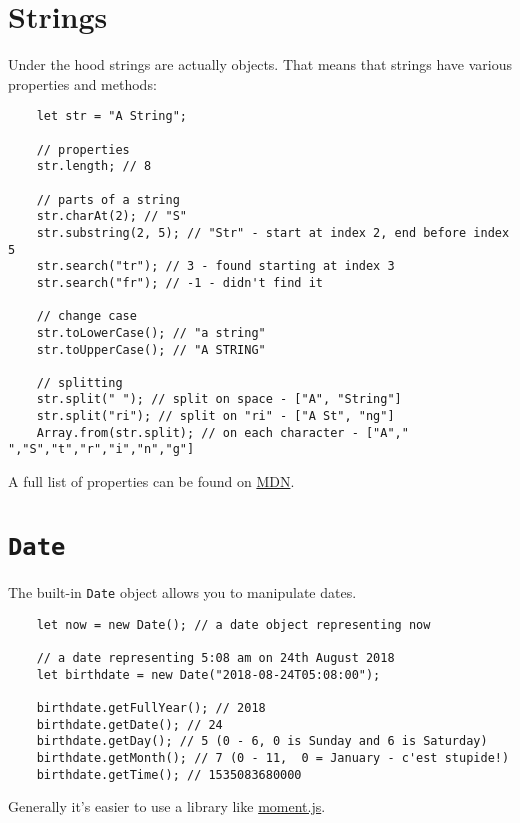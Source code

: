 \section{Strings}

Under the hood strings are actually objects. That means that strings have various properties and methods:

\begin{verbatim}
    let str = "A String";

    // properties
    str.length; // 8

    // parts of a string
    str.charAt(2); // "S"
    str.substring(2, 5); // "Str" - start at index 2, end before index 5
    str.search("tr"); // 3 - found starting at index 3
    str.search("fr"); // -1 - didn't find it

    // change case
    str.toLowerCase(); // "a string"
    str.toUpperCase(); // "A STRING"

    // splitting
    str.split(" "); // split on space - ["A", "String"]
    str.split("ri"); // split on "ri" - ["A St", "ng"]
    Array.from(str.split); // on each character - ["A"," ","S","t","r","i","n","g"]
\end{verbatim}

A full list of properties can be found on \href{https://developer.mozilla.org/en-US/docs/Web/JavaScript/Reference/Global_Objects/String}{MDN}.

\pagebreak

\section{\texttt{Date}}

The built-in \texttt{Date} object allows you to manipulate dates.

\begin{verbatim}
    let now = new Date(); // a date object representing now

    // a date representing 5:08 am on 24th August 2018
    let birthdate = new Date("2018-08-24T05:08:00");

    birthdate.getFullYear(); // 2018
    birthdate.getDate(); // 24
    birthdate.getDay(); // 5 (0 - 6, 0 is Sunday and 6 is Saturday)
    birthdate.getMonth(); // 7 (0 - 11,  0 = January - c'est stupide!)
    birthdate.getTime(); // 1535083680000
\end{verbatim}

Generally it's easier to use a library like \href{http://momentjs.com}{moment.js}.


